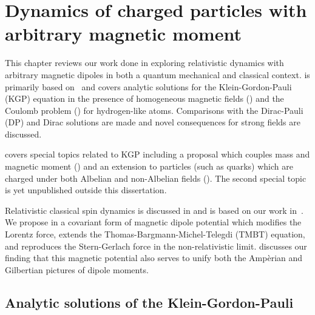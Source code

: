 \chapter{Dynamics of charged particles with arbitrary magnetic moment}
\label{chap:moment}
\noindent This chapter reviews our work done in exploring relativistic dynamics with arbitrary magnetic dipoles in both a quantum mechanical and classical context.  is primarily based on~\cite{Steinmetz:2018ryf} and covers analytic solutions for the Klein-Gordon-Pauli (KGP) equation in the presence of homogeneous magnetic fields () and the Coulomb problem () for hydrogen-like atoms. Comparisons with the Dirac-Pauli (DP) and Dirac solutions are made and novel consequences for strong fields are discussed.

 covers special topics related to KGP including a proposal which couples mass and magnetic moment () and an extension to particles (such as quarks) which are charged under both Albelian and non-Albelian fields (). The second special topic is yet unpublished outside this dissertation.

Relativistic classical spin dynamics is discussed in  and is based on our work in~\cite{Rafelski:2017hce}. We propose in  a covariant form of magnetic dipole potential which modifies the Lorentz force, extends the Thomas-Bargmann-Michel-Telegdi (TMBT) equation, and reproduces the Stern-Gerlach force in the non-relativistic limit.  discusses our finding that this magnetic potential also serves to unify both the Amp{\`e}rian and Gilbertian pictures of dipole moments.

\section{Analytic solutions of the Klein-Gordon-Pauli}
\label{sec:kgpapplications}


